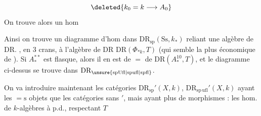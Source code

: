 \[
 \deleted{k_0=k\longrightarrow A_0}
\]
On trouve alors un hom 

Ainsi on trouve un diagramme  d'hom dans $\mathrm{DR}_{\mathrm{sp}}(\mathrm{Ss},k_*)$
reliant une algèbre de DR. , en 3 crans, à l'algèbre de DR  $\mathrm{DR}(\Phi_{*k},T)$ (qui semble la plus économique de ). Si $A_*^{**}$ est  flasque, alors il en est de $=$ de $\mathrm{DR}(A_*^{10},T)$, et le diagramme ci-dessus se trouve dans $\mathrm{DR}_{\unsure{\mathrm{spUfl}|\mathrm{spufl}|\mathrm{spfl}}}$.

On va introduire maintenant les catégories $\mathrm{DR}_{\mathrm{sp}}'(X,k)$, $\mathrm{DR}_{\mathrm{sp\,ufl}}'(X,k)$ ayant les $=\mathrm{s}$ objets que les catégories sans $'$, mais ayant plus de morphismes : les hom. de $k$-algèbres   à p.d., respectant $T$
